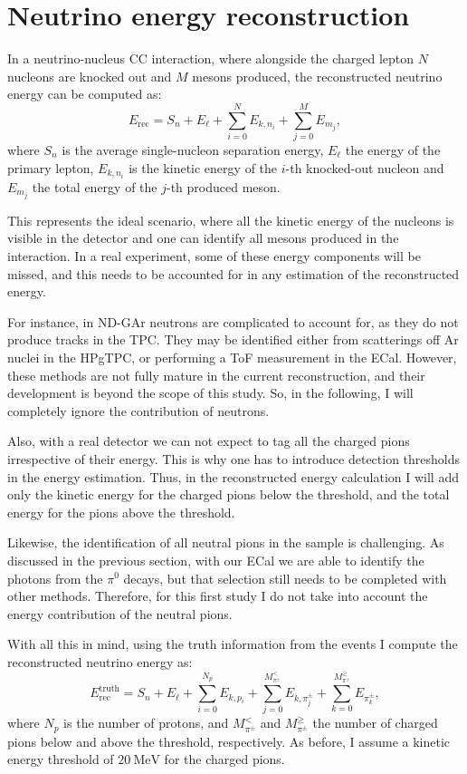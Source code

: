 \section{Neutrino energy reconstruction}
\label{sec:gar_energy}

In a neutrino-nucleus CC interaction, where alongside the charged lepton $N$ nucleons are knocked out and $M$ mesons produced, the reconstructed neutrino energy can be computed as:
\begin{equation}
    E_{\mathrm{rec}} = S_{n} + E_{\ell} + \sum_{i=0}^{N} E_{k,n_{i}} + \sum_{j=0}^{M} E_{m_{j}},
\end{equation}
where $S_{n}$ is the average single-nucleon separation energy, $E_{\ell}$ the energy of the primary lepton, $E_{k,n_{i}}$ is the kinetic energy of the $i$-th knocked-out nucleon and $E_{m_{j}}$ the total energy of the $j$-th produced meson.

This represents the ideal scenario, where all the kinetic energy of the nucleons is visible in the detector and one can identify all mesons produced in the interaction. In a real experiment, some of these energy components will be missed, and this needs to be accounted for in any estimation of the reconstructed energy.

For instance, in ND-GAr neutrons are complicated to account for, as they do not produce tracks in the TPC. They may be identified either from scatterings off Ar nuclei in the HPgTPC, or performing a ToF measurement in the ECal. However, these methods are not fully mature in the current reconstruction, and their development is beyond the scope of this study. So, in the following, I will completely ignore the contribution of neutrons.

Also, with a real detector we can not expect to tag all the charged pions irrespective of their energy. This is why one has to introduce detection thresholds in the energy estimation. Thus, in the reconstructed energy calculation I will add only the kinetic energy for the charged pions below the threshold, and the total energy for the  pions above the threshold.

Likewise, the identification of all neutral pions in the sample is challenging. As discussed in the previous section, with our ECal we are able to identify the photons from the $\pi^{0}$ decays, but that selection still needs to be completed with other methods. Therefore, for this first study I do not take into account the energy contribution of the neutral pions.

With all this in mind, using the truth information from the events I compute the reconstructed neutrino energy as:
\begin{equation}
    E^{\mathrm{truth}}_{\mathrm{rec}} = S_{n} + E_{\ell} + \sum_{i=0}^{N_{p}} E_{k,p_{i}} + \sum_{j=0}^{M_{\pi^{\pm}}^{<}} E_{k,\pi^{\pm}_{j}} + \sum_{k=0}^{M_{\pi^{\pm}}^{\geq}} E_{\pi^{\pm}_{k}},
\end{equation}
where $N_{p}$ is the number of protons, and $M_{\pi^{\pm}}^{<}$ and $M_{\pi^{\pm}}^{\geq}$ the number of charged pions below and above the threshold, respectively. As before, I assume a kinetic energy threshold of $20~\mathrm{MeV}$ for the charged pions.

